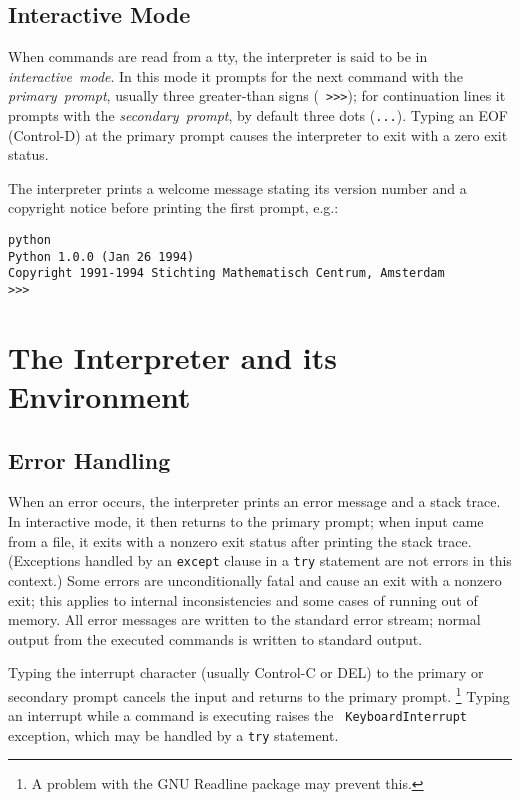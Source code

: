 \subsection{Interactive Mode}

When commands are read from a tty, the interpreter is said to be in
{\em interactive\ mode}.  In this mode it prompts for the next command
with the {\em primary\ prompt}, usually three greater-than signs ({\tt
>>>}); for continuation lines it prompts with the {\em secondary\
prompt}, by default three dots ({\tt ...}).  Typing an EOF (Control-D)
at the primary prompt causes the interpreter to exit with a zero exit
status.

The interpreter prints a welcome message stating its version number
and a copyright notice before printing the first prompt, e.g.:

\bcode\begin{verbatim}
python
Python 1.0.0 (Jan 26 1994)
Copyright 1991-1994 Stichting Mathematisch Centrum, Amsterdam
>>>
\end{verbatim}\ecode

\section{The Interpreter and its Environment}

\subsection{Error Handling}

When an error occurs, the interpreter prints an error
message and a stack trace.  In interactive mode, it then returns to
the primary prompt; when input came from a file, it exits with a
nonzero exit status after printing
the stack trace.  (Exceptions handled by an {\tt except} clause in a
{\tt try} statement are not errors in this context.)  Some errors are
unconditionally fatal and cause an exit with a nonzero exit; this
applies to internal inconsistencies and some cases of running out of
memory.  All error messages are written to the standard error stream;
normal output from the executed commands is written to standard
output.

Typing the interrupt character (usually Control-C or DEL) to the
primary or secondary prompt cancels the input and returns to the
primary prompt.%
\footnote{
        A problem with the GNU Readline package may prevent this.
}
Typing an interrupt while a command is executing raises the {\tt
KeyboardInterrupt} exception, which may be handled by a {\tt try}
statement.

